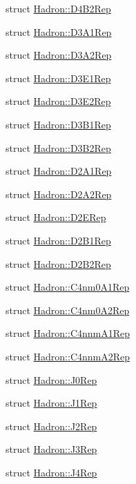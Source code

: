 \begin{DoxyCompactItemize}
\item 
struct \mbox{\hyperlink{structHadron_1_1D4B2Rep}{Hadron\+::\+D4\+B2\+Rep}}
\item 
struct \mbox{\hyperlink{structHadron_1_1D3A1Rep}{Hadron\+::\+D3\+A1\+Rep}}
\item 
struct \mbox{\hyperlink{structHadron_1_1D3A2Rep}{Hadron\+::\+D3\+A2\+Rep}}
\item 
struct \mbox{\hyperlink{structHadron_1_1D3E1Rep}{Hadron\+::\+D3\+E1\+Rep}}
\item 
struct \mbox{\hyperlink{structHadron_1_1D3E2Rep}{Hadron\+::\+D3\+E2\+Rep}}
\item 
struct \mbox{\hyperlink{structHadron_1_1D3B1Rep}{Hadron\+::\+D3\+B1\+Rep}}
\item 
struct \mbox{\hyperlink{structHadron_1_1D3B2Rep}{Hadron\+::\+D3\+B2\+Rep}}
\item 
struct \mbox{\hyperlink{structHadron_1_1D2A1Rep}{Hadron\+::\+D2\+A1\+Rep}}
\item 
struct \mbox{\hyperlink{structHadron_1_1D2A2Rep}{Hadron\+::\+D2\+A2\+Rep}}
\item 
struct \mbox{\hyperlink{structHadron_1_1D2ERep}{Hadron\+::\+D2\+E\+Rep}}
\item 
struct \mbox{\hyperlink{structHadron_1_1D2B1Rep}{Hadron\+::\+D2\+B1\+Rep}}
\item 
struct \mbox{\hyperlink{structHadron_1_1D2B2Rep}{Hadron\+::\+D2\+B2\+Rep}}
\item 
struct \mbox{\hyperlink{structHadron_1_1C4nm0A1Rep}{Hadron\+::\+C4nm0\+A1\+Rep}}
\item 
struct \mbox{\hyperlink{structHadron_1_1C4nm0A2Rep}{Hadron\+::\+C4nm0\+A2\+Rep}}
\item 
struct \mbox{\hyperlink{structHadron_1_1C4nnmA1Rep}{Hadron\+::\+C4nnm\+A1\+Rep}}
\item 
struct \mbox{\hyperlink{structHadron_1_1C4nnmA2Rep}{Hadron\+::\+C4nnm\+A2\+Rep}}
\item 
struct \mbox{\hyperlink{structHadron_1_1J0Rep}{Hadron\+::\+J0\+Rep}}
\item 
struct \mbox{\hyperlink{structHadron_1_1J1Rep}{Hadron\+::\+J1\+Rep}}
\item 
struct \mbox{\hyperlink{structHadron_1_1J2Rep}{Hadron\+::\+J2\+Rep}}
\item 
struct \mbox{\hyperlink{structHadron_1_1J3Rep}{Hadron\+::\+J3\+Rep}}
\item 
struct \mbox{\hyperlink{structHadron_1_1J4Rep}{Hadron\+::\+J4\+Rep}}
\item 

\end{DoxyCompactItemize}
